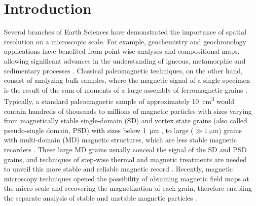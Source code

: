 \section{Introduction}

Several branches of Earth Sciences have demonstrated the importance of spatial resolution on a microscopic scale. For example, geochemistry and
geochronology applications have benefited from point-wise analyses
and compositional maps, allowing significant advances in the understanding of
igneous, metamorphic and sedimentary processes \citep{Verberne2020, Barnes2019,
Davidson2007}. Classical paleomagnetic techniques, on the other hand, consist
of analyzing bulk samples, where the magnetic signal of a single specimen is
the result of the sum of moments of a large assembly of ferromagnetic grains
\citep{Dunlop1997}. Typically, a standard paleomagnetic sample of
approximately \qty{10}{\cm\cubed} would contain hundreds of thousands
to millions of magnetic particles with sizes varying from magnetically stable
single-domain (SD) and vortex state grains (also called pseudo-single domain,
PSD) with sizes below \qty{1}{\um} \DIFaddbegin {}\DIFaddend , to large ($\gg \qty{1}{\um}$) grains with
multi-domain (MD) magnetic structures, which are less stable magnetic recorders \DIFdelbegin {}\DIFdelend \DIFaddbegin {}\DIFaddend .
These large MD grains usually conceal the signal of the SD
and PSD grains, and techniques of step-wise thermal and magnetic treatments are
needed to unveil this more stable and reliable magnetic record
\citep{Tauxe2018}. Recently, magnetic microscopy techniques opened the
possibility of obtaining magnetic field maps at the micro-scale and recovering the
magnetization of each grain, therefore enabling the separate analysis of stable
and unstable magnetic particles \citep{DeGroot2018, Lima2014, Weiss2007,
DeGroot2014}.

